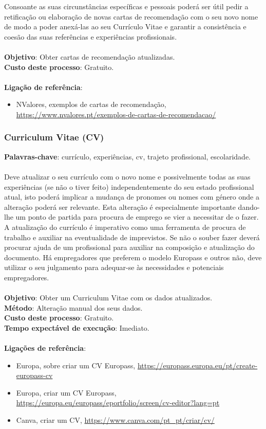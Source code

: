 Consoante as suas circunstâncias específicas e pessoais poderá ser útil
pedir a retificação ou elaboração de novas cartas de recomendação com o
seu novo nome de modo a poder anexá-las ao seu Currículo Vitae e
garantir a consistência e coesão das suas referências e experiências
profissionais. \\
\\
\textbf{Objetivo}: Obter cartas de recomendação atualizadas. \\
\textbf{Custo deste processo}: Gratuito. \\
\\
\textbf{Ligação de referência}:
\begin{itemize}
	\item NValores, exemplos de cartas de recomendação, \url{https://www.nvalores.pt/exemplos-de-cartas-de-recomendacao/}
\end{itemize}

\subsubsection{Curriculum Vitae (CV)}

\textbf{Palavras-chave}: currículo, experiências, cv, trajeto
profissional, escolaridade. \\
\\
Deve atualizar o seu currículo com o novo nome e possivelmente todas as
suas experiências (se não o tiver feito) independentemente do seu estado
profissional atual, isto poderá implicar a mudança de pronomes ou nomes
com género onde a alteração poderá ser relevante. Esta alteração é
especialmente importante dando-lhe um ponto de partida para procura de
emprego se vier a necessitar de o fazer. A atualização do currículo é
imperativo como uma ferramenta de procura de trabalho e auxiliar na
eventualidade de imprevistos. Se não o souber fazer deverá procurar
ajuda de um profissional para auxiliar na composição e atualização do
documento. Há empregadores que preferem o modelo Europass e outros não,
deve utilizar o seu julgamento para adequar-se às necessidades e
potenciais empregadores. \\
\\
\textbf{Objetivo}: Obter um Curriculum Vitae com os dados atualizados. \\
\textbf{Método}: Alteração manual dos seus dados. \\
\textbf{Custo deste processo}: Gratuito. \\
\textbf{Tempo expectável de execução}: Imediato. \\
\\
\textbf{Ligações de referência}:
\begin{itemize}
	\item Europa, sobre criar um CV Europass, \url{https://europass.europa.eu/pt/create-europass-cv}
	\item Europa, criar um CV Europass, \url{https://europa.eu/europass/eportfolio/screen/cv-editor?lang=pt}
	\item Canva, criar um CV, \url{https://www.canva.com/pt\_pt/criar/cv/}
\end{itemize}

